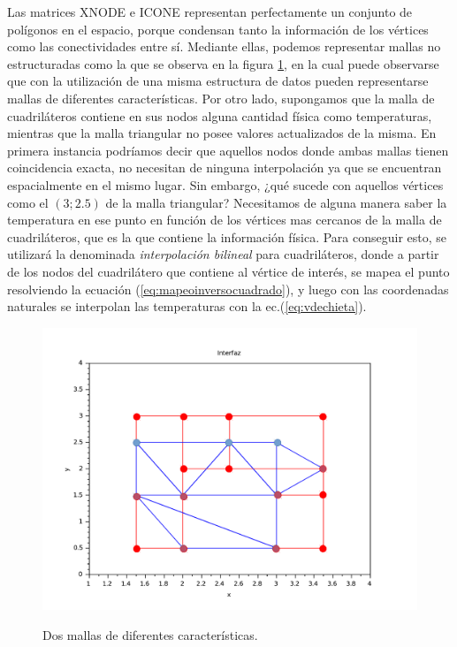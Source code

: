 Las matrices XNODE e ICONE representan perfectamente un conjunto de polígonos en el espacio, porque condensan tanto la información de los vértices como las conectividades entre sí. Mediante ellas, podemos representar mallas no estructuradas como la que se observa en la figura \ref{fig:malla1}, en la cual puede observarse que con la utilización de una misma estructura de datos pueden representarse mallas de diferentes características. Por otro lado, supongamos que la malla de cuadriláteros contiene en sus nodos alguna cantidad física como temperaturas, mientras que la malla triangular no posee valores actualizados de la misma. En primera instancia podríamos decir que aquellos nodos donde ambas mallas tienen coincidencia exacta, no necesitan de ninguna interpolación ya que se encuentran espacialmente en el mismo lugar. Sin embargo, ¿qué sucede con aquellos vértices como el $(3;2.5)$ de la malla triangular? Necesitamos de alguna manera saber la temperatura en ese punto en función de los vértices mas cercanos de la malla de cuadriláteros, que es la que contiene la información física. Para conseguir esto, se utilizará la denominada \emph{interpolación bilineal} para cuadriláteros, donde a partir de los nodos del cuadrilátero que contiene al vértice de interés, se mapea el punto resolviendo la ecuación (\ref{eq:mapeoinversocuadrado}), y luego con las coordenadas naturales se interpolan las temperaturas con la ec.(\ref{eq:vdechieta}).


\begin{figure}
\centering
\includegraphics[scale=.55]{mallascuad1tri3p.pdf}
\caption{\label{fig:malla1} } Dos mallas de diferentes características.
\end{figure}

